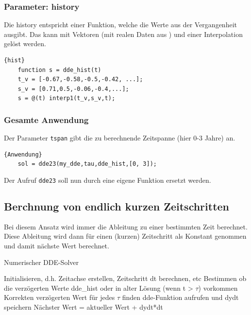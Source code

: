 \subsubsection{Parameter: history}
Die history entspricht einer Funktion, welche die Werte aus der Vergangenheit ausgibt. 
Das kann mit Vektoren (mit realen Daten aus \cite{NOAA:Daten}) und einer Interpolation gelöst werden.
\begin{lstlisting}[style=MATLAB]{hist}
	function s = dde_hist(t)
	t_v = [-0.67,-0.58,-0.5,-0.42, ...];
	s_v = [0.71,0.5,-0.06,-0.4,...];  
	s = @(t) interp1(t_v,s_v,t);
\end{lstlisting}

\subsubsection{Gesamte Anwendung}
Der Parameter \texttt{tspan} gibt die zu berechnende Zeitspanne (hier 0-3 Jahre) an.
\begin{lstlisting}[style=MATLAB]{Anwendung}
	sol = dde23(my_dde,tau,dde_hist,[0, 3]);
\end{lstlisting}
Der Aufruf \texttt{dde23} soll nun durch eine eigene Funktion ersetzt werden.
 

\subsection{Berchnung von endlich kurzen Zeitschritten}
Bei diesem Ansatz wird immer die Ableitung zu einer bestimmten Zeit berechnet.
Diese Ableitung wird dann für einen (kurzen) Zeitschritt als Konstant genommen und damit nächste Wert berechnet.
\begin{algorithm}
	\caption{Numerischer DDE-Solver}
	\label{algo1}
	\begin{algorithmic}[1]
		\State Initialisieren, d.h. Zeitachse erstellen, Zeitschritt dt berechnen, etc
		\State Bestimmen ob die verzögerten Werte dde\_hist oder in alter Lösung (wenn t > $\tau$) vorkommen
		\State Korrekten verzögerten Wert für jedes $\tau$ finden
		\EndFor
		\State dde-Funktion aufrufen und dydt speichern
		\State Nächster Wert = aktueller Wert + dydt*dt
		\EndFor
	\end{algorithmic}
\end{algorithm}

